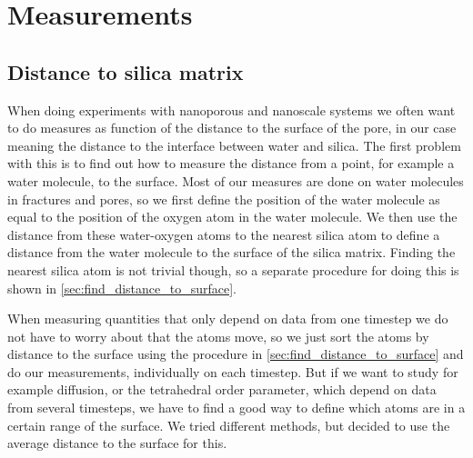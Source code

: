 \chapter{Measurements}
%
%
\section{Distance to silica matrix\label{sec:measuring_distance_to_matrix}}
%
When doing experiments with nanoporous and nanoscale systems we often want to do measures as function of the distance to the surface of the pore, in our case meaning the distance to the interface between water and silica. The first problem with this is to find out how to measure the distance from a point, for example a water molecule, to the surface. Most of our measures are done on water molecules in fractures and pores, so we first define the position of the water molecule as equal to the position of the oxygen atom in the water molecule. We then use the distance from these water-oxygen atoms to the nearest silica atom to define a distance from the water molecule to the surface of the silica matrix. Finding the nearest silica atom is not trivial though, so a separate procedure for doing this is shown in \cref{sec:find_distance_to_surface}.

When measuring quantities that only depend on data from one timestep we do not have to worry about that the atoms move, so we just sort the atoms by distance to the surface using the procedure in \cref{sec:find_distance_to_surface} and do our measurements, individually on each timestep. But if we want to study for example diffusion, or the tetrahedral order parameter, which depend on data from several timesteps, we have to find a good way to define which atoms are in a certain range of the surface. We tried different methods, but decided to use the average distance to the surface for this.

